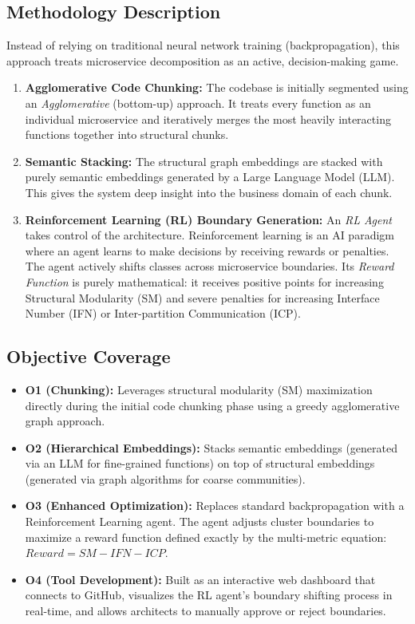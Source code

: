 \documentclass[12pt, a4paper]{article}
\begin{document}
\subsection{Methodology Description}
Instead of relying on traditional neural network training (backpropagation), this approach treats microservice decomposition as an active, decision-making game.
\begin{enumerate}
    \item \textbf{Agglomerative Code Chunking:} The codebase is initially segmented using an \textit{Agglomerative} (bottom-up) approach. It treats every function as an individual microservice and iteratively merges the most heavily interacting functions together into structural chunks.
    \item \textbf{Semantic Stacking:} The structural graph embeddings are stacked with purely semantic embeddings generated by a Large Language Model (LLM). This gives the system deep insight into the business domain of each chunk.
    \item \textbf{Reinforcement Learning (RL) Boundary Generation:} An \textit{RL Agent} takes control of the architecture. Reinforcement learning is an AI paradigm where an agent learns to make decisions by receiving rewards or penalties. The agent actively shifts classes across microservice boundaries. Its \textit{Reward Function} is purely mathematical: it receives positive points for increasing Structural Modularity (SM) and severe penalties for increasing Interface Number (IFN) or Inter-partition Communication (ICP).
\end{enumerate}

\subsection{Objective Coverage}
\begin{itemize}
    \item \textbf{O1 (Chunking):} Leverages structural modularity (SM) maximization directly during the initial code chunking phase using a greedy agglomerative graph approach.
    \item \textbf{O2 (Hierarchical Embeddings):} Stacks semantic embeddings (generated via an LLM for fine-grained functions) on top of structural embeddings (generated via graph algorithms for coarse communities).
    \item \textbf{O3 (Enhanced Optimization):} Replaces standard backpropagation with a Reinforcement Learning agent. The agent adjusts cluster boundaries to maximize a reward function defined exactly by the multi-metric equation: $Reward = SM - IFN - ICP$.
    \item \textbf{O4 (Tool Development):} Built as an interactive web dashboard that connects to GitHub, visualizes the RL agent's boundary shifting process in real-time, and allows architects to manually approve or reject boundaries.
\end{itemize}
\end{document}
